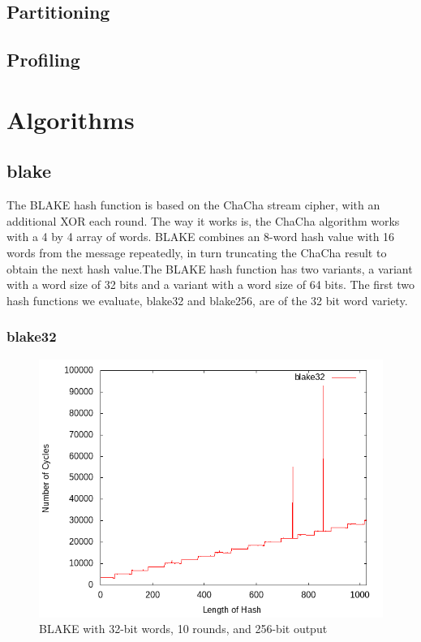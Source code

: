 \documentclass[10pt,a4paper]{article}
\begin{document}
\subsection{Partitioning}

\subsection{Profiling}




\section{Algorithms}
\subsection{blake}
The BLAKE hash function is based on the ChaCha stream cipher, with an additional XOR each round. The way it works is,
the ChaCha algorithm works with a 4 by 4 array of words. BLAKE combines an 8-word hash value with 16 words from the 
message repeatedly, in turn truncating the ChaCha result to obtain the next hash value.The BLAKE hash function has two variants, 
a variant with a word size of 32 bits and a variant with a word size of 64 bits. The first two hash functions we evaluate, blake32 and blake256, are 
of the 32 bit word variety.

\subsubsection{blake32}
\begin{figure}[H]
    \begin{center}
        \includegraphics[scale=0.5]{images_fast_run/blake32.png} 
        \caption{BLAKE with 32-bit words, 10 rounds, and 256-bit output}
    \end{center}
\end{figure}
\end{document}
